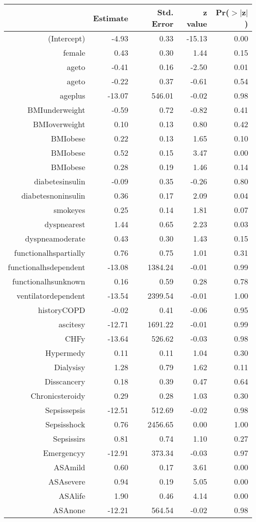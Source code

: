\begin{tabular}{rrrrr}
  \hline
 & Estimate & Std. Error & z value & Pr($>$$|$z$|$) \\ 
  \hline
(Intercept) & -4.93 & 0.33 & -15.13 & 0.00 \\ 
  female & 0.43 & 0.30 & 1.44 & 0.15 \\ 
  age\-65\-to\-74 & -0.41 & 0.16 & -2.50 & 0.01 \\ 
  age\-75\-to\-84 & -0.22 & 0.37 & -0.61 & 0.54 \\ 
  age\-85\-plus & -13.07 & 546.01 & -0.02 & 0.98 \\ 
  BMI\-underweight & -0.59 & 0.72 & -0.82 & 0.41 \\ 
  BMI\-overweight & 0.10 & 0.13 & 0.80 & 0.42 \\ 
  BMI\-obese\-1 & 0.22 & 0.13 & 1.65 & 0.10 \\ 
  BMI\-obese\-2 & 0.52 & 0.15 & 3.47 & 0.00 \\ 
  BMI\-obese\-3 & 0.28 & 0.19 & 1.46 & 0.14 \\ 
  diabetes\-insulin & -0.09 & 0.35 & -0.26 & 0.80 \\ 
  diabetes\-noninsulin & 0.36 & 0.17 & 2.09 & 0.04 \\ 
  smoke\-yes & 0.25 & 0.14 & 1.81 & 0.07 \\ 
  dyspnea\-rest & 1.44 & 0.65 & 2.23 & 0.03 \\ 
  dyspnea\-moderate & 0.43 & 0.30 & 1.43 & 0.15 \\ 
  functional\-hs\-partially & 0.76 & 0.75 & 1.01 & 0.31 \\ 
  functional\-hs\-dependent & -13.08 & 1384.24 & -0.01 & 0.99 \\ 
  functional\-hs\-unknown & 0.16 & 0.59 & 0.28 & 0.78 \\ 
  ventilator\-dependent & -13.54 & 2399.54 & -0.01 & 1.00 \\ 
  history\-COPD & -0.02 & 0.41 & -0.06 & 0.95 \\ 
  ascites\-y & -12.71 & 1691.22 & -0.01 & 0.99 \\ 
  CHF\-y & -13.64 & 526.62 & -0.03 & 0.98 \\ 
  Hyper\-med\-y & 0.11 & 0.11 & 1.04 & 0.30 \\ 
  Dialysis\-y & 1.28 & 0.79 & 1.62 & 0.11 \\ 
  Diss\-cancer\-y & 0.18 & 0.39 & 0.47 & 0.64 \\ 
  Chronic\-steroid\-y & 0.29 & 0.28 & 1.03 & 0.30 \\ 
  Sepsis\-sepsis & -12.51 & 512.69 & -0.02 & 0.98 \\ 
  Sepsis\-shock & 0.76 & 2456.65 & 0.00 & 1.00 \\ 
  Sepsis\-sirs & 0.81 & 0.74 & 1.10 & 0.27 \\ 
  Emergency\-y & -12.91 & 373.34 & -0.03 & 0.97 \\ 
  ASA\-mild & 0.60 & 0.17 & 3.61 & 0.00 \\ 
  ASA\-severe & 0.94 & 0.19 & 5.05 & 0.00 \\ 
  ASA\-life & 1.90 & 0.46 & 4.14 & 0.00 \\ 
  ASA\-none & -12.21 & 564.54 & -0.02 & 0.98 \\ 
   \hline
\end{tabular}
